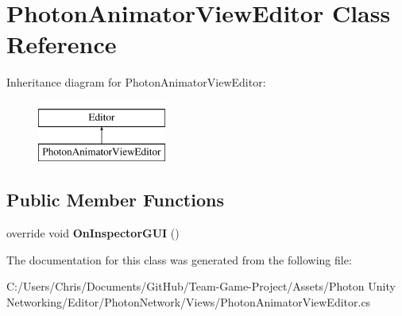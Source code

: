 \hypertarget{class_photon_animator_view_editor}{}\section{Photon\+Animator\+View\+Editor Class Reference}
\label{class_photon_animator_view_editor}
Inheritance diagram for Photon\+Animator\+View\+Editor\+:\begin{figure}[H]
\begin{center}
\leavevmode
\includegraphics[height=2.000000cm]{class_photon_animator_view_editor}
\end{center}
\end{figure}
\subsection*{Public Member Functions}
\begin{DoxyCompactItemize}
\item 
override void {\bfseries On\+Inspector\+G\+UI} ()\hypertarget{class_photon_animator_view_editor_a6d3340b275891161ebbb3f2ac06bda3c}{}\label{class_photon_animator_view_editor_a6d3340b275891161ebbb3f2ac06bda3c}

\end{DoxyCompactItemize}


The documentation for this class was generated from the following file\+:\begin{DoxyCompactItemize}
\item 
C\+:/\+Users/\+Chris/\+Documents/\+Git\+Hub/\+Team-\/\+Game-\/\+Project/\+Assets/\+Photon Unity Networking/\+Editor/\+Photon\+Network/\+Views/Photon\+Animator\+View\+Editor.\+cs\end{DoxyCompactItemize}
